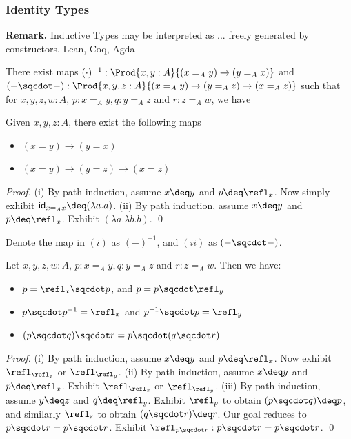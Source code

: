 \subsubsection{Identity Types}

\textbf{Remark.} Inductive Types may be interpreted as ...
freely generated by constructors.
Lean, Coq, Agda


\begin{proposition}
  There exist maps $(\cdot)^{-1} : \Prod{x, y : A}{(x =_A y) \to (y =_A x)}$ and $(-\sqcdot-) : \Prod{x,y,z :A}{(x =_A y) \to (y =_A z) \to (x =_A z)}$
  such that for $x, y, z, w : A$, $p : x =_A y, q : y =_A z$ and $r : z =_A w$, we have
\end{proposition}

\begin{proposition}
  Given $x, y, z : A$, there exist the following maps 
  \begin{itemize}
    \item [(i)] $(x = y) \to (y = x)$
    \item [(ii)] $(x = y) \to (y = z) \to (x = z)$
  \end{itemize}
\end{proposition}
\textit{Proof.} (i) By path induction, assume $x \deq y$ and $p \deq \refl_x$. Now simply exhibit $\mathsf{id}_{x =_A x} \deq (\lambda a.a)$. 
(ii) By path induction, assume $x \deq y$ and $p \deq \refl_x$. Exhibit $(\lambda a.\lambda b.b)$. \qed

Denote the map in $(i)$ as $(-)^{-1}$, and $(ii)$ as $(- \sqcdot -)$. 

\begin{proposition} Let $x, y, z, w : A$, $p : x =_A y, q : y =_A z$ and $r : z =_A w$. Then we have:
  \begin{itemize}
    \item [(i)] $p = \refl_x \sqcdot p$, and $p = p \sqcdot \refl_y$
    \item [(ii)] $p \sqcdot p^{-1} = \refl_x$ and $p^{-1} \sqcdot p = \refl_y$
    \item [(iii)] $(p \sqcdot q) \sqcdot r = p \sqcdot (q \sqcdot r)$ 
   \end{itemize} 
\end{proposition}
\textit{Proof.} (i) By path induction, assume $x \deq y$ and $p \deq \refl_x$. Now exhibit $\refl_{\refl_x}$ or $\refl_{\refl_y}$.
(ii) By path induction, assume $x \deq y$ and $p \deq \refl_x$. Exhibit $\refl_{\refl_x}$ or $\refl_{\refl_y}$.
(iii) By path induction, assume $y \deq z$ and $q \deq \refl_y$. Exhibit $\refl_p$ to obtain $(p \sqcdot q) \deq  p$,
and similarly $\refl_r$ to obtain $(q \sqcdot r) \deq r$. Our goal reduces to $p \sqcdot r = p \sqcdot r$.
Exhibit $\refl_{p \sqcdot r} : p \sqcdot r = p \sqcdot r$.
\qed

